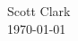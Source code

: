 \documentclass[12pt]{article}
\begin{document}
\begin{flushleft}
Scott Clark \\
\today \\
\end{flushleft}
\end{document}
